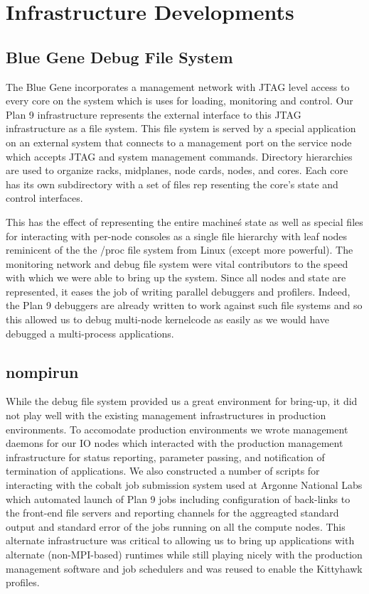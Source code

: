 \chapter{Infrastructure Developments}
\section{Blue Gene Debug File System}

The Blue Gene incorporates a management network with JTAG level access to every
core on the system which is uses for loading, monitoring and control.
Our Plan 9 infrastructure represents the external interface to this JTAG infrastructure as
a file system. This file system is served by a special application on an external system
that connects to a management port on the service node which accepts JTAG and system
management commands. Directory hierarchies are used to organize racks, midplanes,
node cards, nodes, and cores. Each core has its own subdirectory with a set of files rep­
resenting the core's state and control interfaces.

This has the effect of representing the entire machine\'s state as well as special files
for interacting with per-node consoles as a single file hierarchy with leaf nodes
reminicent of the the /proc file system from Linux (except more powerful).
The monitoring network and debug file system were vital contributors to the speed with
which we were able to bring up the system.  Since all nodes and state are represented, 
it eases the job of writing parallel debuggers and profilers.  Indeed, the Plan 9
debuggers are already written to work against such file systems and so this allowed us
to debug multi-node kernelcode as easily as we would have debugged a multi-process
applications.

\section{nompirun}

While the debug file system provided us a great environment for bring-up, it
did not play well with the existing management infrastructures in production 
environments.  To accomodate production environments we wrote management daemons
for our IO nodes which interacted with the production management infrastructure for
status reporting, parameter passing, and notification of termination of applications.
We also constructed a number of scripts for interacting with the cobalt job submission
system used at Argonne National Labs which automated launch of Plan 9 jobs including
configuration of back-links to the front-end file servers and reporting channels for
the aggreagted standard output and standard error of the jobs running on all the 
compute nodes.  This alternate infrastructure was critical to allowing us to bring up
applications with alternate (non-MPI-based) runtimes while still playing nicely with 
the production management software and job schedulers and was reused to enable the
Kittyhawk profiles. 

